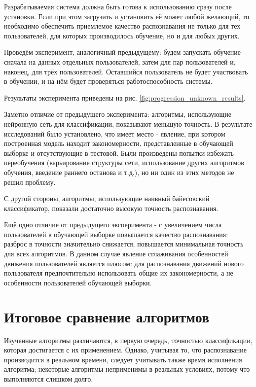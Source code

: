 Разрабатываемая система должна быть готова к использованию сразу после установки. Если при этом загрузить и установить её может любой желающий, то необходимо обеспечить приемлемое качество распознавания не только для тех пользователей, для которых производилось обучение, но и для любых других.

Проведём эксперимент, аналогичный предыдущему: будем запускать обучение сначала на данных отдельных пользователей, затем для пар пользователей и, наконец, для трёх пользователей. Оставшийся пользователь не будет участвовать в обучении, и на нём будет проверяться работоспособность системы.

Результаты эксперимента приведены на рис. \ref{fig:progression_unknown_results}.


Заметно отличие от предыдущего эксперимента: алгоритмы, использующие нейронную сеть для классификации, показывают меньшую точность. В результате исследований было установлено, что имеет место  - явление, при котором построенная модель находит закономерности, представленные в обучающей выборке и отсутствующие в тестовой. Были произведены попытки избежать переобучения (варьирование структуры сети, использование других алгоритмов обучения, введение раннего останова и т.д.), но ни один из этих методов не решил проблему.

С другой стороны, алгоритмы, использующие наивный байесовский классификатор, показали достаточно высокую точность распознавания.

Ещё одно отличие от предыдущего эксперимента - с увеличением числа пользователей в обучающей выборке повышается качество распознавания: разброс в точности значительно снижается, повышается минимальная точность для всех алгоритмов. В данном случае явление сглаживания особенностей движения пользователей является плюсом: для распознавания движений нового пользователя предпочтительно использовать общие их закономерности, а не особенности пользователей обучающей выборки.

\section{Итоговое сравнение алгоритмов}

Изученные алгоритмы различаются, в первую очередь, точностью классификации, которая достигается с их применением. Однако, учитывая то, что распознавание производится в реальном времени, следует учитывать также время исполнения алгоритма; некоторые алгоритмы неприменимы в реальных условиях, потому что выполняются слишком долго.


